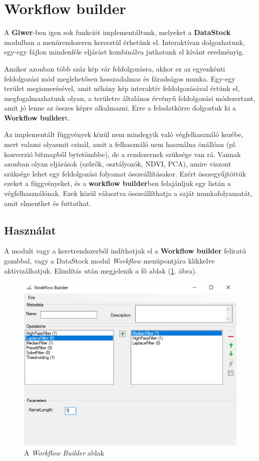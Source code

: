 \documentclass[a4paper,12pt]{article}
\begin{document}
\section{Workflow builder}

A \textbf{Giwer}-ben igen sok funkciót implementáltunk, melyeket a \textbf{DataStock} modulban a menürendszeren keresztül érhetünk el. Interaktívan dolgozhatunk, egy-egy fájlon mindenféle eljárást kombinálva juthatunk el kívánt eredményig. 

Amikor azonban több száz kép vár feldolgozásra, akkor ez az egyenkénti feldolgozási mód meglehetősen hosszadalmas és fáradságos munka. Egy-egy terület megismerésével, amit néhány kép interaktív feldolgozásával értünk el, megfogalmazhatunk olyan, a területre általános érvényű feldolgozási módszertant, amit jó lenne az összes képre alkalmazni. Erre a feladatkörre dolgoztuk ki a \textbf{Workflow builder}t.

Az implementált függvények közül nem mindegyik való végfelhasználó kezébe, mert valami olyasmit csinál, amit a felhasználó nem használna önállóan (pl. konverzió bitmapből bytetömbbe), de a rendszernek szüksége van rá. Vannak azonban olyan eljárások (szűrők, osztályozók, NDVI, PCA), amire viszont szüksége lehet egy feldolgozási folyamat összeállításakor. Ezért összegyűjtöttük ezeket a függvényeket, és a \textbf{workflow builder}ben felajánljuk egy listán a végfelhasználónak. Ezek közül választva összeállíthatja a saját munkafolyamatát, amit elmenthet és futtathat.

\subsection{Használat}

A modult vagy a keretrendszerből indíthatjuk el a \textbf{Workflow builder} feliratú gombbal, vagy a DataStock modul \textit{Workflow} menüpontjára klikkelve aktivizálhatjuk. Elindítás után megjelenik a fő ablak (\ref{fig:workflowmain}. ábra).

	\begin{figure}
	\centering
	\includegraphics[width=12cm]{workflow_main}
	\caption{A \textit{Workflow Builder} ablak}
	\label{fig:workflowmain}
    \end{figure}
\end{document}
